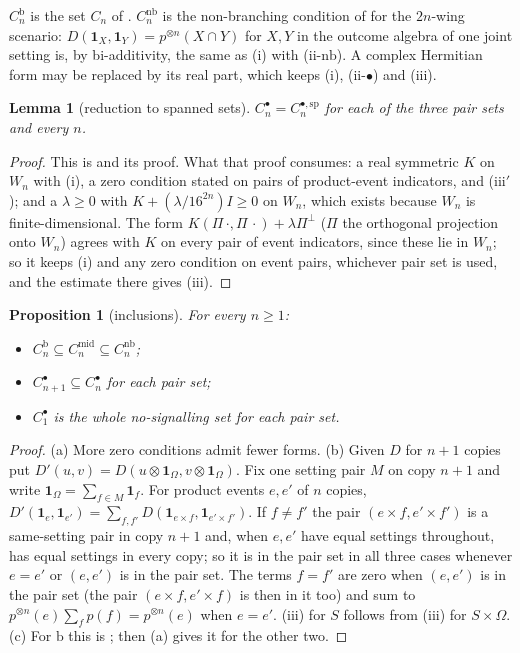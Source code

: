 \documentclass[11pt,a4paper]{article}
\newtheorem{proposition}[theorem]{Proposition}
\newtheorem{lemma}[theorem]{Lemma}
\theoremstyle{definition}
\theoremstyle{remark}
\newcommand{\ind}[1]{\mathbf{1}_{#1}}
\newcommand{\nb}{\mathrm{nb}}
\newcommand{\md}{\mathrm{mid}}
\newcommand{\br}{\mathrm{b}}
\newcommand{\ps}{\bullet}
\begin{document}
$C_n^{\br}$ is the set $C_n$ of \cite[Definition 1]{R7}. $C_n^{\nb}$ is the non-branching condition of \cite[Section 4]{DHW} for the $2n$-wing scenario: $D(\ind{X}, \ind{Y}) = p^{\otimes n}(X \cap Y)$ for $X, Y$ in the outcome algebra of one joint setting is, by bi-additivity, the same as (i) with (ii-$\nb$). A complex Hermitian form may be replaced by its real part, which keeps (i), (ii-$\ps$) and (iii).

\begin{lemma}[reduction to spanned sets]\label{l:red}
$C_n^{\ps} = C_n^{\ps,\mathrm{sp}}$ for each of the three pair sets and every $n$.
\end{lemma}

\begin{proof}
This is \cite[Lemma 3]{R7} and its proof. What that proof consumes: a real symmetric $K$ on $W_n$ with (i), a zero condition stated on pairs of product-event indicators, and (iii$'$); and a $\lambda \ge 0$ with $K + (\lambda/16^{2n}) I \ge 0$ on $W_n$, which exists because $W_n$ is finite-dimensional. The form $K(\Pi\,\cdot, \Pi\,\cdot) + \lambda \Pi^{\perp}$ ($\Pi$ the orthogonal projection onto $W_n$) agrees with $K$ on every pair of event indicators, since these lie in $W_n$; so it keeps (i) and any zero condition on event pairs, whichever pair set is used, and the estimate there gives (iii).
\end{proof}

\begin{proposition}[inclusions]\label{p:incl}
For every $n \ge 1$:
\begin{itemize}
  \item[(a)] $C_n^{\br} \subseteq C_n^{\md} \subseteq C_n^{\nb}$;
  \item[(b)] $C_{n+1}^{\ps} \subseteq C_n^{\ps}$ for each pair set;
  \item[(c)] $C_1^{\ps}$ is the whole no-signalling set for each pair set.
\end{itemize}
\end{proposition}

\begin{proof}
(a) More zero conditions admit fewer forms. (b) Given $D$ for $n + 1$ copies put $D'(u, v) = D(u \otimes \ind{\Omega}, v \otimes \ind{\Omega})$. Fix one setting pair $M$ on copy $n + 1$ and write $\ind{\Omega} = \sum_{f \in M} \ind{f}$. For product events $e, e'$ of $n$ copies, $D'(\ind{e}, \ind{e'}) = \sum_{f, f'} D(\ind{e \times f}, \ind{e' \times f'})$. If $f \neq f'$ the pair $(e \times f, e' \times f')$ is a same-setting pair in copy $n + 1$ and, when $e, e'$ have equal settings throughout, has equal settings in every copy; so it is in the pair set in all three cases whenever $e = e'$ or $(e, e')$ is in the pair set. The terms $f = f'$ are zero when $(e, e')$ is in the pair set (the pair $(e \times f, e' \times f)$ is then in it too) and sum to $p^{\otimes n}(e) \sum_f p(f) = p^{\otimes n}(e)$ when $e = e'$. (iii) for $S$ follows from (iii) for $S \times \Omega$. (c) For $\br$ this is \cite[Proposition 4]{R7}; then (a) gives it for the other two.
\end{proof}
\end{document}
